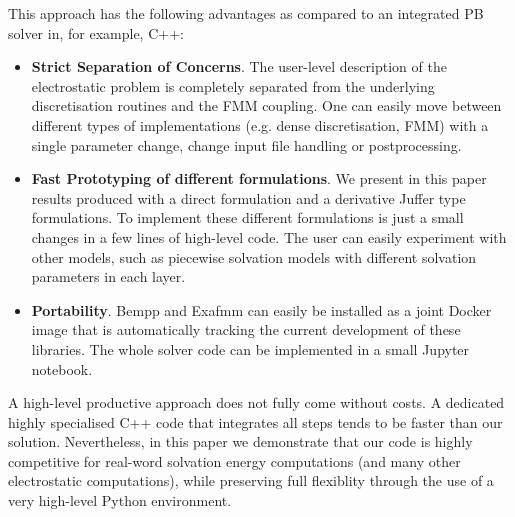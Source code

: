 This approach has the following advantages as compared to an integrated PB solver in, for example, C++:
\begin{itemize}
	\item \textbf{Strict Separation of Concerns}. The user-level description of the electrostatic problem is completely separated from the underlying discretisation routines and the FMM coupling. One can easily move between different types of implementations (e.g. dense discretisation, FMM) with a single parameter change, change input file handling or postprocessing.
	\item \textbf{Fast Prototyping of different formulations}. We present in this paper results produced with a direct formulation and a derivative Juffer type formulations. To implement these different formulations is just a small changes in a few lines of high-level code. The user can easily experiment with other models, such as piecewise solvation models with different solvation parameters in each layer.
	\item \textbf{Portability}. Bempp and Exafmm can easily be installed as a joint Docker image that is automatically tracking the current development of these libraries. The whole solver code can be implemented in a small Jupyter notebook.
\end{itemize}
A high-level productive approach does not fully come without costs. A dedicated highly specialised C++ code that integrates all steps tends to be faster than our solution. Nevertheless, in this paper we demonstrate that our code is highly competitive for real-word solvation energy computations (and many other electrostatic computations), while preserving full flexiblity through the use of a very high-level Python environment.



